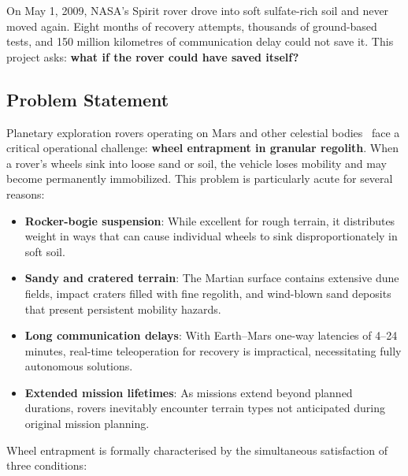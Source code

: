 \documentclass[12pt,a4paper]{article}
\begin{document}
\begin{tcolorbox}[
    enhanced, colback=white, colframe=headerblue,
    boxrule=0.8pt, arc=5pt,
    left=12pt, right=12pt, top=8pt, bottom=8pt
]
{\color{black!60} On May 1, 2009, NASA's Spirit rover drove into soft sulfate-rich soil and
never moved again. Eight months of recovery attempts, thousands of ground-based
tests, and 150 million kilometres of communication delay could not save it.
This project asks: \textbf{what if the rover could have saved itself?}}
\end{tcolorbox}

\vspace{8pt}

\subsection{Problem Statement}

Planetary exploration rovers operating on Mars and other celestial bodies~\cite{squyres2004mer,grotzinger2012msl,farley2020mars2020} face a critical operational challenge: \textbf{wheel entrapment in granular regolith}. When a rover's wheels sink into loose sand or soil, the vehicle loses mobility and may become permanently immobilized. This problem is particularly acute for several reasons:

\begin{itemize}[leftmargin=*, itemsep=3pt]
    \item \textbf{Rocker-bogie suspension}: While excellent for rough terrain, it distributes weight in ways that can cause individual wheels to sink disproportionately in soft soil.
    \item \textbf{Sandy and cratered terrain}: The Martian surface contains extensive dune fields, impact craters filled with fine regolith, and wind-blown sand deposits that present persistent mobility hazards.
    \item \textbf{Long communication delays}: With Earth--Mars one-way latencies of 4--24 minutes, real-time teleoperation for recovery is impractical, necessitating fully autonomous solutions.
    \item \textbf{Extended mission lifetimes}: As missions extend beyond planned durations, rovers inevitably encounter terrain types not anticipated during original mission planning.
\end{itemize}

\vspace{4pt}
Wheel entrapment is formally characterised by the simultaneous satisfaction of three conditions:
\end{document}
